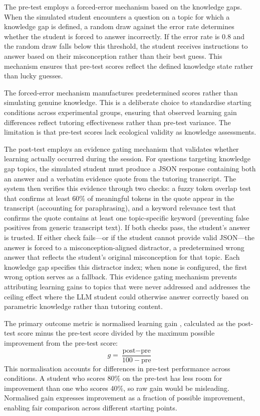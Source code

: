 \documentclass[logo,bsc,singlespacing,parskip,online]{infthesis}
\begin{document}
The pre-test employs a forced-error mechanism based on the knowledge gaps. When the simulated student encounters a question on a topic for which a knowledge gap is defined, a random draw against the error rate determines whether the student is forced to answer incorrectly. If the error rate is 0.8 and the random draw falls below this threshold, the student receives instructions to answer based on their misconception rather than their best guess. This mechanism ensures that pre-test scores reflect the defined knowledge state rather than lucky guesses.

The forced-error mechanism manufactures predetermined scores rather than simulating genuine knowledge. This is a deliberate choice to standardise starting conditions across experimental groups, ensuring that observed learning gain differences reflect tutoring effectiveness rather than pre-test variance. The limitation is that pre-test scores lack ecological validity as knowledge assessments.

The post-test employs an evidence gating mechanism that validates whether learning actually occurred during the session. For questions targeting knowledge gap topics, the simulated student must produce a JSON response containing both an answer and a verbatim evidence quote from the tutoring transcript. The system then verifies this evidence through two checks: a fuzzy token overlap test that confirms at least 60\% of meaningful tokens in the quote appear in the transcript (accounting for paraphrasing), and a keyword relevance test that confirms the quote contains at least one topic-specific keyword (preventing false positives from generic transcript text). If both checks pass, the student's answer is trusted. If either check fails---or if the student cannot provide valid JSON---the answer is forced to a misconception-aligned distractor, a predetermined wrong answer that reflects the student's original misconception for that topic. Each knowledge gap specifies this distractor index; when none is configured, the first wrong option serves as a fallback. This evidence gating mechanism prevents attributing learning gains to topics that were never addressed and addresses the ceiling effect where the LLM student could otherwise answer correctly based on parametric knowledge rather than tutoring content.

The primary outcome metric is normalised learning gain \citep{hake1998interactive}, calculated as the post-test score minus the pre-test score divided by the maximum possible improvement from the pre-test score:
\begin{equation}
g = \frac{\text{post} - \text{pre}}{100 - \text{pre}}
\end{equation}
This normalisation accounts for differences in pre-test performance across conditions. A student who scores 80\% on the pre-test has less room for improvement than one who scores 40\%, so raw gain would be misleading. Normalised gain expresses improvement as a fraction of possible improvement, enabling fair comparison across different starting points.
\end{document}
